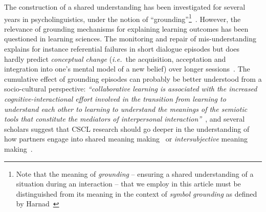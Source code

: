 \documentclass{sig-alternate}
\newcommand{\ie}{{\textit{i.e.~}}}
\begin{document}
The construction of a shared understanding has been investigated for several
years in psycholinguistics, under the  notion of ``grounding''\footnote{Note
that the meaning of \emph{grounding} -- ensuring a shared understanding of a
situation during an interaction -- that we employ in this article must be
distinguished from its meaning in the context of \emph{symbol grounding} as
defined by Harnad~\cite{harnad1990symbol}}~\cite{clark1986referring}.  However, the
relevance of grounding mechanisms for explaining learning outcomes has been
questioned in learning sciences. The monitoring and repair of mis-understanding
explains for instance referential failures in short dialogue episodes but does
hardly predict \emph{conceptual change} (\ie the acquisition, acceptation and
integration into one's mental model of a new belief)
over longer sessions~\cite{dillenbourg2006sharing}. The cumulative effect of
grounding episodes can probably be better understood from a socio-cultural
perspective: \emph{``collaborative learning is associated with the increased
cognitive-interactional effort involved in the transition from learning to
understand each other to learning to understand the meanings of the semiotic
tools that constitute the mediators of interpersonal
interaction''}~\cite{baker1999role}, and
several scholars suggest that CSCL research should go deeper in the
understanding of how partners engage into shared meaning
making~\cite{stahl2007meaning} or \emph{intersubjective} meaning
making~\cite{suthers2006technology}.
\end{document}
